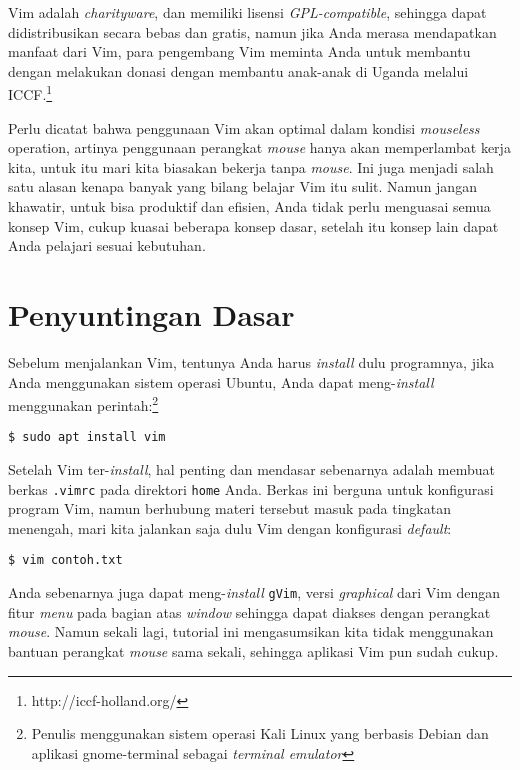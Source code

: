 \documentclass{article}
\begin{document}
Vim adalah \emph{charityware}, dan memiliki lisensi
\emph{GPL-compatible}, sehingga dapat didistribusikan secara
bebas dan gratis, namun jika Anda merasa mendapatkan manfaat
dari Vim, para pengembang Vim meminta Anda untuk membantu
dengan melakukan donasi dengan membantu anak-anak di Uganda
melalui ICCF.\footnote{http://iccf-holland.org/}

Perlu dicatat bahwa penggunaan Vim akan optimal dalam
kondisi \emph{mouseless} operation, artinya penggunaan
perangkat \emph{mouse} hanya akan memperlambat kerja kita,
untuk itu mari kita biasakan bekerja tanpa \emph{mouse}. Ini
juga menjadi salah satu alasan kenapa banyak yang bilang
belajar Vim itu sulit. Namun jangan khawatir, untuk bisa
produktif dan efisien, Anda tidak perlu menguasai semua
konsep Vim, cukup kuasai beberapa konsep dasar, setelah itu
konsep lain dapat Anda pelajari sesuai kebutuhan.

\section{Penyuntingan Dasar}

Sebelum menjalankan Vim, tentunya Anda harus \emph{install}
dulu programnya, jika Anda menggunakan sistem operasi
Ubuntu, Anda dapat meng-\emph{install} menggunakan
perintah:\footnote{Penulis menggunakan sistem operasi Kali Linux
yang berbasis Debian dan aplikasi gnome-terminal sebagai 
\emph{terminal emulator}}

\begin{verbatim}
$ sudo apt install vim
\end{verbatim}

Setelah Vim ter-\emph{install}, hal penting dan mendasar
sebenarnya adalah membuat berkas \verb=.vimrc= pada
direktori \verb=home= Anda. Berkas ini berguna untuk
konfigurasi program Vim, namun berhubung materi tersebut
masuk pada tingkatan menengah, mari kita jalankan saja dulu
Vim dengan konfigurasi \emph{default}:

\begin{verbatim}
$ vim contoh.txt
\end{verbatim}

Anda sebenarnya juga dapat meng-\emph{install} \verb=gVim=,
versi \emph{graphical} dari Vim dengan fitur \emph{menu}
pada bagian atas \emph{window} sehingga dapat diakses dengan
perangkat \emph{mouse}.  Namun sekali lagi, tutorial ini
mengasumsikan kita tidak menggunakan bantuan perangkat
\emph{mouse} sama sekali, sehingga aplikasi Vim pun sudah
cukup.
\end{document}
